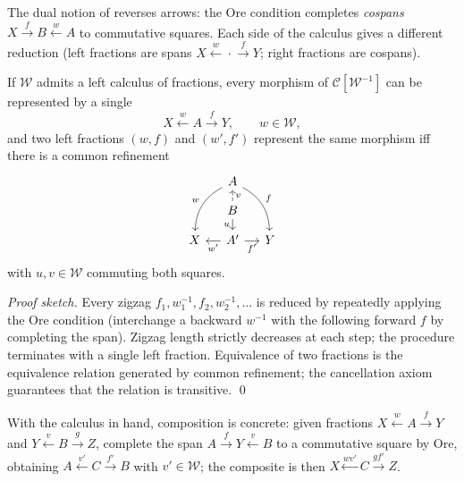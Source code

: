 \begin{remark}
The dual notion of  reverses arrows:
the Ore condition completes \emph{cospans} $X \xrightarrow{f} B
\xleftarrow{w} A$ to commutative squares. Each side of the calculus
gives a different reduction (left fractions are spans $X \xleftarrow{w}
\cdot \xrightarrow{f} Y$; right fractions are cospans).
\end{remark}

\begin{theorem}
\label{thm:fractions-reduction}
If $\mathcal{W}$ admits a left calculus of fractions, every morphism of
$\mathcal{C}[\mathcal{W}^{-1}]$ can be represented by a single
\begin{equation*}
  X \xleftarrow{w} A \xrightarrow{f} Y, \qquad w \in \mathcal{W},
\end{equation*}
and two left fractions $(w, f)$ and $(w', f')$ represent the same
morphism iff there is a common refinement
\begin{equation*}
  \begin{tikzcd}[column sep=small, row sep=small]
    & A \arrow[ldd, "w"', bend right] \arrow[rdd, "f", bend left] & \\
    & B \arrow[d, "u"'] \arrow[u, "v"', dashed] & \\
    X & A' \arrow[l, "w'"] \arrow[r, "f'"'] & Y
  \end{tikzcd}
\end{equation*}
with $u, v \in \mathcal{W}$ commuting both squares.
\end{theorem}

\begin{proof}[Proof sketch]
Every zigzag $f_1, w_1^{-1}, f_2, w_2^{-1}, \ldots$ is reduced by
repeatedly applying the Ore condition (interchange a backward $w^{-1}$
with the following forward $f$ by completing the span). Zigzag length
strictly decreases at each step; the procedure terminates with a single
left fraction. Equivalence of two fractions is the equivalence relation
generated by common refinement; the cancellation axiom guarantees that
the relation is transitive.
\qed
\end{proof}

\begin{remark}
With the calculus in hand, composition is concrete: given fractions $X
\xleftarrow{w} A \xrightarrow{f} Y$ and $Y \xleftarrow{v} B
\xrightarrow{g} Z$, complete the span $A \xrightarrow{f} Y \xleftarrow{v}
B$ to a commutative square by Ore, obtaining $A \xleftarrow{v'} C
\xrightarrow{f'} B$ with $v' \in \mathcal{W}$; the composite is then
$X \xleftarrow{wv'} C \xrightarrow{gf'} Z$.
\end{remark}

